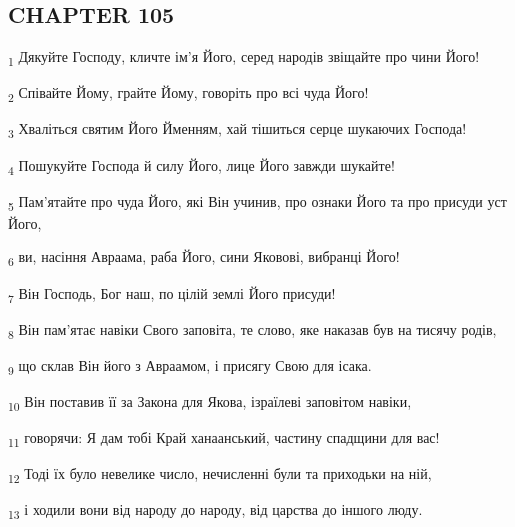 \subsection{CHAPTER 105}
\begin{tcolorbox}
\textsubscript{1} Дякуйте Господу, кличте ім'я Його, серед народів звіщайте про чини Його!
\end{tcolorbox}
\begin{tcolorbox}
\textsubscript{2} Співайте Йому, грайте Йому, говоріть про всі чуда Його!
\end{tcolorbox}
\begin{tcolorbox}
\textsubscript{3} Хваліться святим Його Йменням, хай тішиться серце шукаючих Господа!
\end{tcolorbox}
\begin{tcolorbox}
\textsubscript{4} Пошукуйте Господа й силу Його, лице Його завжди шукайте!
\end{tcolorbox}
\begin{tcolorbox}
\textsubscript{5} Пам'ятайте про чуда Його, які Він учинив, про ознаки Його та про присуди уст Його,
\end{tcolorbox}
\begin{tcolorbox}
\textsubscript{6} ви, насіння Авраама, раба Його, сини Яковові, вибранці Його!
\end{tcolorbox}
\begin{tcolorbox}
\textsubscript{7} Він Господь, Бог наш, по цілій землі Його присуди!
\end{tcolorbox}
\begin{tcolorbox}
\textsubscript{8} Він пам'ятає навіки Свого заповіта, те слово, яке наказав був на тисячу родів,
\end{tcolorbox}
\begin{tcolorbox}
\textsubscript{9} що склав Він його з Авраамом, і присягу Свою для ісака.
\end{tcolorbox}
\begin{tcolorbox}
\textsubscript{10} Він поставив її за Закона для Якова, ізраїлеві заповітом навіки,
\end{tcolorbox}
\begin{tcolorbox}
\textsubscript{11} говорячи: Я дам тобі Край ханаанський, частину спадщини для вас!
\end{tcolorbox}
\begin{tcolorbox}
\textsubscript{12} Тоді їх було невелике число, нечисленні були та приходьки на ній,
\end{tcolorbox}
\begin{tcolorbox}
\textsubscript{13} і ходили вони від народу до народу, від царства до іншого люду.
\end{tcolorbox}
